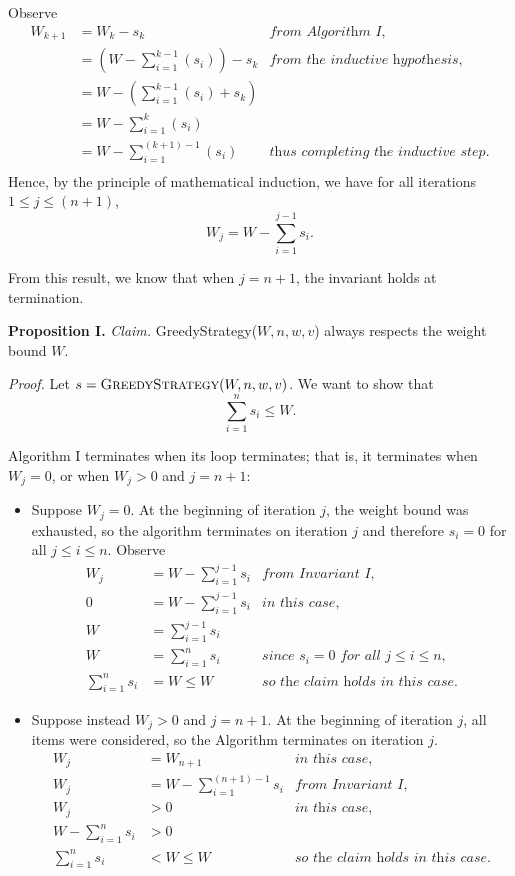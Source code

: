 \begin{enumerate}
\begin{solution}
Observe
\begin{align*}
W_{k+1}&=W_k-s_k&\textit{from Algorithm I,}\\
&=\left(W-\sum_{i=1}^{k-1}(s_i)\right)-s_k&\textit{from the inductive hypothesis,}\\
&=W-\left(\sum_{i=1}^{k-1}(s_i)+s_k\right)\\
&=W-\sum_{i=1}^{k}(s_i)\\
&=W-\sum_{i=1}^{(k+1)-1}(s_i)&\textit{thus completing the inductive step.}\\
\end{align*}
Hence, by the principle of mathematical induction, we have for all iterations $1\leq j\leq(n+1)$, \[W_j=W-\sum_{i=1}^{j-1}{s_i}.\] 

From this result, we know that when $j=n+1$, the invariant holds at termination.

\textbf{Proposition I. }\textit{Claim. }{\sc GreedyStrategy}($W,n,w,v$) always respects the weight bound $W$.

\textit{Proof. }Let $s=\textsc{GreedyStrategy}(W,n,w,v)$. We want to show that \[\sum_{i=1}^n{s_i}\leq W.\]

Algorithm I terminates when its loop terminates; that is, it terminates when $W_j=0$, or when $W_j>0$ and $j=n+1$:
\begin{itemize}
    \item Suppose $W_j=0$. At the beginning of iteration $j$, the weight bound was exhausted, so the algorithm terminates on iteration $j$ and therefore $s_i=0$ for all $j\leq i\leq n$. Observe
    \begin{align*}
    W_j&=W-\sum_{i=1}^{j-1}{s_i}&\textit{from Invariant I,}\\
    0&=W-\sum_{i=1}^{j-1}{s_i}&\textit{in this case,}\\
    W&=\sum_{i=1}^{j-1}{s_i}\\
    W&=\sum_{i=1}^n{s_i}&\textit{since $s_i=0$ for all $j\leq i\leq n$,}\\
    \sum_{i=1}^n{s_i}&=W\leq W&\textit{so the claim holds in this case.}
    \end{align*}
    \item Suppose instead $W_j>0$ and $j=n+1$. At the beginning of iteration $j$, all items were considered, so the Algorithm terminates on iteration $j$.
    \begin{align*}
    W_j&=W_{n+1}&\textit{in this case,}\\
    W_j&=W-\sum_{i=1}^{(n+1)-1}{s_i}&\textit{from Invariant I,}\\
    W_j&>0&\textit{in this case,}\\
    W-\sum_{i=1}^{n}{s_i}&>0\\
    \sum_{i=1}^{n}{s_i}&<W\leq W&\textit{so the claim holds in this case.}
    \end{align*}
\end{itemize}


\end{solution}
\end{enumerate}

